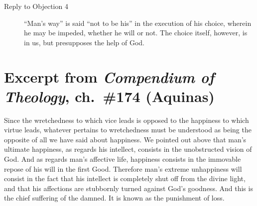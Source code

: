 \documentclass{bookclub}
\begin{document}
\begin{multicols}{2}
\begin{description}
		\item[Reply to Objection 4] ``Man's way'' is said ``not to be his'' in the execution of his choice, wherein he may be impeded, whether he will or not. The choice itself, however, is in us, but presupposes the help of God.
		
	\end{description}
	\section{Excerpt from \emph{Compendium of Theology}, ch.~\#174 (Aquinas)}
	Since the wretchedness to which vice leads is opposed to the happiness to which virtue leads, whatever pertains to wretchedness must be understood as being the opposite of all we have said about happiness. We pointed out above that man’s ultimate happiness, as regards his intellect, consists in the unobstructed vision of God. And as regards man’s affective life, happiness consists in the immovable repose of his will in the first Good. Therefore man’s extreme unhappiness will consist in the fact that his intellect is completely shut off from the divine light, and that his affections are stubbornly turned against God’s goodness. And this is the chief suffering of the damned. It is known as the punishment of loss.
	

\end{multicols}
\end{document}
